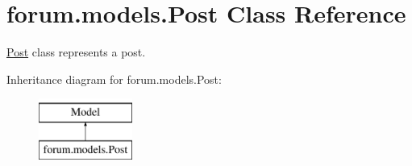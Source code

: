 \hypertarget{classforum_1_1models_1_1_post}{}\section{forum.\+models.\+Post Class Reference}
\label{classforum_1_1models_1_1_post}


\mbox{\hyperlink{classforum_1_1models_1_1_post}{Post}} class represents a post.  


Inheritance diagram for forum.\+models.\+Post\+:\begin{figure}[H]
\begin{center}
\leavevmode
\includegraphics[height=2.000000cm]{classforum_1_1models_1_1_post}
\end{center}
\end{figure}
